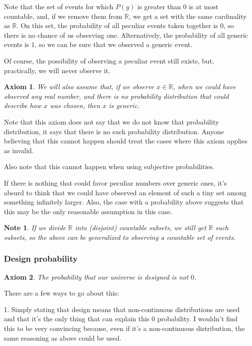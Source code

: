 \documentclass[a4paper
,draft
]{article}
\def\reale{\mathbb{R}}
\newtheorem{axiom}{Axiom}
\newtheorem{note}{Note}
\begin{document}
Note that the set of events for which $P(y)$ is
greater than $0$ is at most countable, and, if we remove them from $\reale$, we
get a set with the same cardinality as $\reale$. On this set, the probability
of all peculiar events taken together is $0$, so there is no chance of us
observing one. Alternatively, the probability of all generic events is $1$,
so we can be sure that we observed a generic event.

Of course, the possibility of observing a peculiar event still exists, but,
practically, we will never observe it.

\begin{axiom}
  We will also assume that, if we observe $x\in\reale$, when we could have
  observed any real number, and there is no probability distribution that could
  describe how $x$ was chosen, then $x$ is generic.
\end{axiom}

Note that this axiom does not say that we do not know that probability
distribution, it says that there is no such probability distribution.
Anyone believing that this cannot happen should treat the cases where
this axiom applies as invalid.

Also note that this cannot happen when using subjective probabilities.

If there is nothing that could favor
peculiar numbers over generic ones, it's absurd to think that we could have
observed an element of such a tiny set among something infinitely larger.
Also, the case with a probability above suggests that this may be the only
reasonable assumption in this case.

\begin{note}
  If we divide $\reale$ into (disjoint) countable subsets, we still get $\reale$
  such subsets, so the above can be generalized to observing a countable set
  of events.
\end{note}

\subsubsection{Design probability}
\begin{axiom}
  The probability that our universe is designed is not $0$.
\end{axiom}

There are a few ways to go about this:

1. Simply stating that design means that non-continuous distributions
are used and that it's the only thing that can explain this $0$
probability. I wouldn't find this to be very convincing because,
even if it's a non-continuous distribution, the same reasoning as
above could be used.
\end{document}
